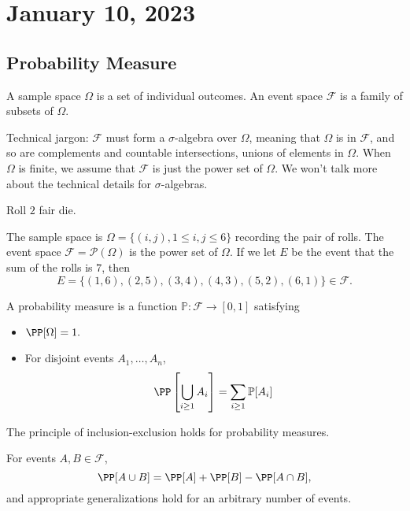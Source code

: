 \section{January 10, 2023}

\subsection{Probability Measure}

\begin{definition}

A \ac{sample space} $\Omega$ is a set of individual outcomes. An \ac{event space} $\mathcal{F}$ is a family of subsets of $\Omega$. 
\end{definition}

Technical jargon: $\mathcal{F}$ must form a $\sigma$-algebra over $\Omega$, meaning that $\Omega$ is in $\mathcal{F}$, and so are complements and countable intersections, unions of elements in $\Omega$. When $\Omega$ is finite, we assume that $\mathcal{F}$ is just the power set of $\Omega$. We won't talk more about the technical details for $\sigma$-algebras.

\begin{example}
\exlabel

Roll $2$ fair die.
\end{example}

The sample space is $\Omega = \{(i,j), 1\leq i,j\leq 6\}$ recording the pair of rolls. The event space $\mathcal{F} = \mathcal{P}(\Omega)$ is the power set of $\Omega$. If we let $E$ be the event that the sum of the rolls is $7$, then 
\[E = \{(1,6), (2,5), (3,4), (4,3), (5,2), (6,1)\}\in \mathcal{F}.\]

\begin{definition}

A \ac{probability measure} is a function $\mathbb{P}: \mathcal{F}\rightarrow [0,1]$ satisfying 
\begin{itemize}
    \item $\PP[\Omega] = 1.$
    \item For disjoint events $A_1, \hdots, A_n$, 
    \[\PP\left[\bigcup_{i\geq 1} A_i\right] = \sum_{i\geq 1}\mathbb{P}[A_i]\]
\end{itemize}
\end{definition}

The principle of inclusion-exclusion holds for probability measures. 
\begin{theorem}
\thmlabel

For events $A,B\in \mathcal{F}$, 
\[\PP[A\cup B] = \PP[A] + \PP[B] - \PP[A\cap B],\]
and appropriate generalizations hold for an arbitrary number of events. 
\end{theorem}


